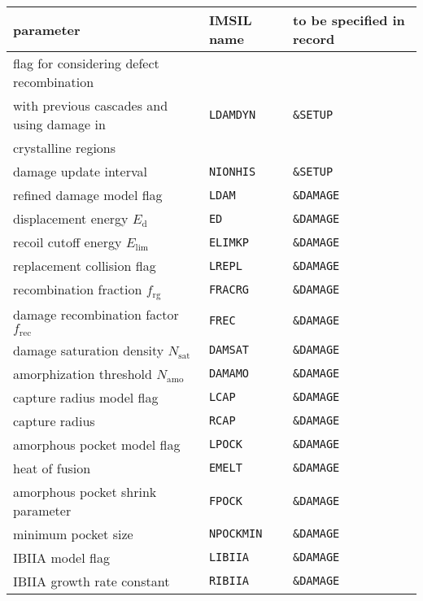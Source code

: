 \begin{center}
\begin{tabular}{lll}
   parameter \quad  & IMSIL name & to be specified in record \\
   \hline
   flag for considering defect recombination  &                               \\
   with previous cascades and using damage in & {\tt LDAMDYN}& {\tt \&SETUP}  \\
   crystalline regions                        &                               \\
   damage update interval                     & {\tt NIONHIS}& {\tt \&SETUP} \\
   refined damage model flag                  & {\tt LDAM}   & {\tt \&DAMAGE} \\
   displacement energy $E_\mathrm{d}$         & {\tt ED}     & {\tt \&DAMAGE} \\
   recoil cutoff energy $E_\mathrm{lim}$      & {\tt ELIMKP} & {\tt \&DAMAGE} \\
   replacement collision flag                 & {\tt LREPL}  & {\tt \&DAMAGE} \\
   recombination fraction $f_\mathrm{rg}$     & {\tt FRACRG} & {\tt \&DAMAGE} \\
   damage recombination factor $f_\mathrm{rec}$ & {\tt FREC} & {\tt \&DAMAGE} \\
   damage saturation density $N_\mathrm{sat}$ & {\tt DAMSAT} & {\tt \&DAMAGE} \\
   amorphization threshold $N_\mathrm{amo}$   & {\tt DAMAMO} & {\tt \&DAMAGE} \\
   capture radius model flag                  & {\tt LCAP}   & {\tt \&DAMAGE} \\
   capture radius                             & {\tt RCAP}   & {\tt \&DAMAGE} \\
   amorphous pocket model flag                & {\tt LPOCK}  & {\tt \&DAMAGE} \\
   heat of fusion                             & {\tt EMELT}  & {\tt \&DAMAGE} \\
   amorphous pocket shrink parameter          & {\tt FPOCK}  & {\tt \&DAMAGE} \\
   minimum pocket size                      & {\tt NPOCKMIN} & {\tt \&DAMAGE} \\
   IBIIA model flag                           & {\tt LIBIIA} & {\tt \&DAMAGE} \\
   IBIIA growth rate constant                 & {\tt RIBIIA} & {\tt \&DAMAGE} \\
\end{tabular}
\end{center}
